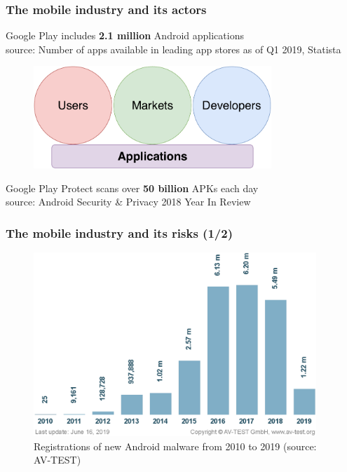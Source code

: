 \begin{frame}
    \frametitle{The mobile industry and its actors}
    \centering

    Google Play includes \textbf{2.1 million} Android applications \\
    \smallskip{}
    \scriptsize{}
    source: Number of apps available in leading app stores as of Q1 2019, Statista

    \begin{figure}[!ht]
        \includegraphics[width=0.8\textwidth]{figures/introduction/actors.pdf}
    \end{figure}

    \normalsize{}
    Google Play Protect scans over \textbf{50 billion} APKs each day \\
    \smallskip{}
    \scriptsize{}
    source: Android Security \& Privacy 2018 Year In Review

\end{frame}

\begin{frame}
    \frametitle{The mobile industry and its risks (1/2)}

    \medskip{}

    \begin{figure}[!ht]
        \includegraphics[width=0.95\textwidth]{figures/introduction/evolution.png}
        \caption{\scriptsize{Registrations of new Android malware from 2010 to 2019 (source: AV-TEST)}}
    \end{figure}

\end{frame}

